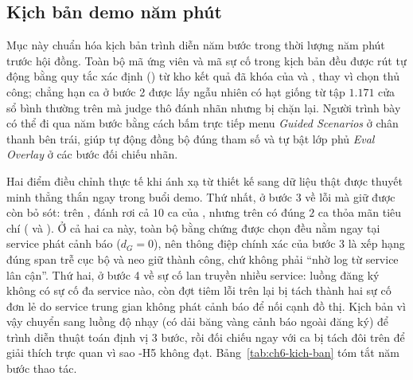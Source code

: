 \subsection{Kịch bản demo năm phút}
\label{sec:ch6-kich-ban}

Mục này chuẩn hóa kịch bản trình diễn năm bước trong thời lượng năm phút trước hội đồng. Toàn bộ mã ứng viên và mã sự cố trong kịch bản đều được rút tự động bằng quy tắc xác định () từ kho kết quả đã khóa của  và , thay vì chọn thủ công; chẳng hạn ca ở bước 2 được lấy ngẫu nhiên có hạt giống từ tập $1.171$ cửa sổ bình thường trên  mà judge thô đánh nhãn  nhưng bị  chặn lại. %
Người trình bày có thể đi qua năm bước bằng cách bấm trực tiếp menu \emph{Guided Scenarios} ở chân thanh bên trái, giúp tự động đồng bộ đúng tham số  và tự bật lớp phủ \emph{Eval Overlay} ở các bước đối chiếu nhãn.

Hai điểm điều chỉnh thực tế khi ánh xạ từ thiết kế sang dữ liệu thật được thuyết minh thẳng thắn ngay trong buổi demo. Thứ nhất, ở bước 3 về lỗi  mà \CTAV{} giữ được còn  bỏ sót: trên , \CTAV{} đánh rơi cả $10$ ca  của , nhưng trên  có đúng $2$ ca thỏa mãn tiêu chí ( và ). %
Ở cả hai ca này, toàn bộ bằng chứng được chọn đều nằm ngay tại service phát cảnh báo ($d_G = 0$), nên thông điệp chính xác của bước 3 là  xếp hạng đúng span trễ cục bộ và  neo giữ thành công, chứ không phải ``nhờ log từ service lân cận''. Thứ hai, ở bước 4 về sự cố lan truyền nhiều service: luồng đăng ký  không có sự cố đa service nào, còn đợt tiêm lỗi  trên  lại bị tách thành hai sự cố đơn lẻ do service trung gian không phát cảnh báo để nối cạnh đồ thị. Kịch bản vì vậy chuyển sang luồng độ nhạy  (có dải băng vàng cảnh báo ngoài đăng ký) để trình diễn thuật toán định vị 3 bước, rồi đối chiếu ngay với ca bị tách đôi trên  để giải thích trực quan vì sao \hyp{H5} không đạt. Bảng~\ref{tab:ch6-kich-ban} tóm tắt năm bước thao tác.

